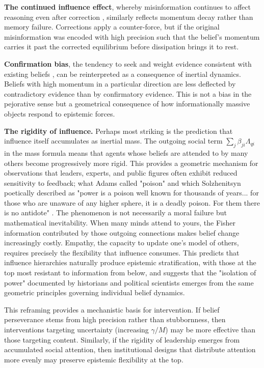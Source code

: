 \documentclass[12pt]{article}
\begin{document}
\textbf{The continued influence effect}, whereby misinformation continues to affect reasoning even after correction \citet{Lewandowsky2012}, similarly reflects momentum decay rather than memory failure. Corrections apply a counter-force, but if the original misinformation was encoded with high precision such that the belief's momentum carries it past the corrected equilibrium before dissipation brings it to rest.

\textbf{Confirmation bias}, the tendency to seek and weight evidence consistent with existing beliefs \citet{nickerson1998}, can be reinterpreted as a consequence of inertial dynamics. Beliefs with high momentum in a particular direction are less deflected by contradictory evidence than by confirmatory evidence. This is not a bias in the pejorative sense but a geometrical consequence of how informationally massive objects respond to epistemic forces.

\textbf{The rigidity of influence.} Perhaps most striking is the prediction that influence itself accumulates as inertial mass. The outgoing social term $\sum_j \beta_{ji}\Lambda_{qi}$ in the mass formula means that agents whose beliefs are attended to by many others become progressively more rigid. This provides a geometric mechanism for observations that leaders, experts, and public figures often exhibit reduced sensitivity to feedback; what Adams called "poison" and which Solzhenitsyn poetically described as "power is a poison well known for thousands of years... for those who are unaware of any higher sphere, it is a deadly poison. For them there is no antidote" \citet{adams1918education, solzhenitsyn1973gulag}. The phenomenon is not necessarily a moral failure but mathematical inevitability. When many minds attend to yours, the Fisher information contributed by those outgoing connections makes belief change increasingly costly. Empathy, the capacity to update one's model of others, requires precisely the flexibility that influence consumes. This predicts that influence hierarchies naturally produce epistemic stratification, with those at the top most resistant to information from below, and suggests that the "isolation of power" documented by historians and political scientists emerges from the same geometric principles governing individual belief dynamics.


This reframing provides a mechanistic basis for intervention. If belief perseverance stems from high precision rather than stubbornness, then interventions targeting uncertainty (increasing $\gamma/M$) may be more effective than those targeting content. Similarly, if the rigidity of leadership emerges from accumulated social attention, then institutional designs that distribute attention more evenly may preserve epistemic flexibility at the top.
\end{document}

